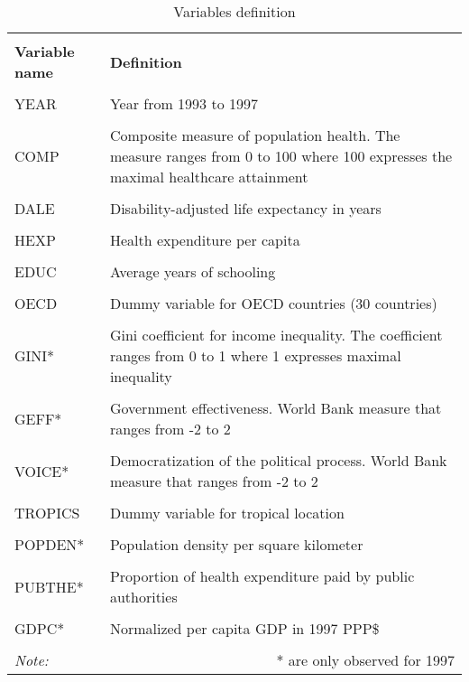 \documentclass[12pt,a4paper]{article}\usepackage[]{graphicx}\usepackage[]{color}
\begin{document}
\begin{table}[htbp] \centering 
  \caption{Variables definition} 
  \label{Variables definition} 
  \normalsize
\begin{tabular}{p{3cm} p{9cm}} 
\\[-1.8ex]\hline 
\hline \\[-1.8ex] 
\textbf{Variable name} & \textbf{Definition} \\ 
\hline \\[-1.8ex] 
YEAR & Year from 1993 to 1997 \\
\hline \\[-1.8ex] 
COMP & Composite measure of population health. The measure ranges from 0 to 100 where 100 expresses the maximal healthcare attainment \\
\hline \\[-1.8ex] 
DALE & Disability-adjusted life expectancy in years \\
\hline \\[-1.8ex] 
HEXP & Health expenditure per capita \\
\hline \\[-1.8ex] 
EDUC & Average years of schooling \\
\hline \\[-1.8ex] 
OECD & Dummy variable for OECD countries (30 countries) \\
\hline \\[-1.8ex] 
GINI* & Gini coefficient for income inequality. The coefficient ranges from 0 to 1 where 1 expresses maximal inequality \\
\hline \\[-1.8ex] 
GEFF* & Government effectiveness. World Bank measure that ranges from -2 to 2 \\
\hline \\[-1.8ex] 
VOICE* & Democratization of the political process. World Bank measure that ranges from -2 to 2 \\
\hline \\[-1.8ex] 
TROPICS & Dummy variable for tropical location \\
\hline \\[-1.8ex] 
POPDEN* & Population density per square kilometer \\
\hline \\[-1.8ex] 
PUBTHE* & Proportion of health expenditure paid by public authorities \\
\hline \\[-1.8ex] 
GDPC* & Normalized per capita GDP in 1997 PPP\$ \\
\hline
\hline \\[-1.8ex] 
\textit{Note:} & \multicolumn{1}{r}{* are only observed for 1997} \\ 
\end{tabular} 
\end{table} 
\end{document}

